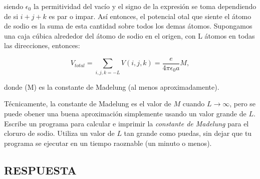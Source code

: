 \documentclass[11pt]{article}
\begin{document}
siendo \(\epsilon_0\) la permitividad del vacío y el signo de la
expresión se toma dependiendo de si \(i +j +k\) es par o impar. Así
entonces, el potencial otal que siente el átomo de sodio es la suma de
esta cantidad sobre todos los demas átomos. Supongamos una caja cúbica
alrededor del átomo de sodio en el origen, con L átomos en todas las
direcciones, entonces:

\[
V_{total} = \sum_{i,j,k=-L} V(i,j,k) = \frac{e}{4\pi \epsilon_0 a} M,
\]

donde (M) es la constante de Madelung (al menos aproximadamente).

Técnicamente, la constante de Madelung es el valor de \(M\) cuando
\(L \to \infty\), pero se puede obener una buena aproximación
simplemente usando un valor grande de \(L\). Escribe un programa para
calcular e imprimir la \emph{constante de Madelung} para el cloruro de
sodio. Utiliza un valor de \(L\) tan grande como puedas, sin dejar que
tu programa se ejecutar en un tiempo raoznable (un minuto o menos).

    \hypertarget{respuesta}{%
\subsection{RESPUESTA}\label{respuesta}}
\end{document}
